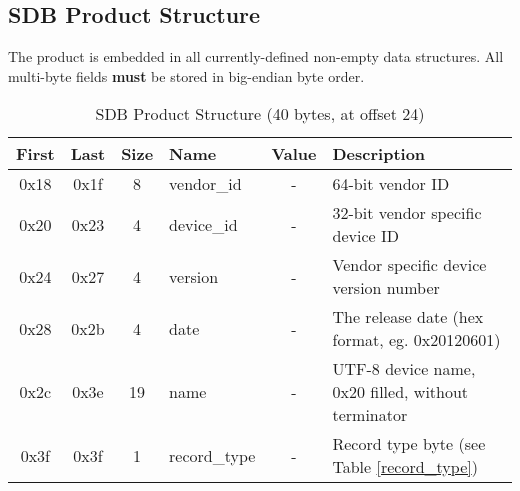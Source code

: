 \documentclass[a4paper, 12pt]{article}
\begin{document}
\subsection{SDB Product Structure}

The product is embedded in all currently-defined non-empty data structures.
All multi-byte fields \textbf{must} be stored in big-endian byte order.

\begin{center}
  \begin{savenotes}
    \begin{table}[!ht]\footnotesize
      \caption{SDB Product Structure (40 bytes, at offset 24)}\label{sdb_product}\centering
        \begin{tabular}{| c | c | c | l | c | p{5cm} |} \hline
        First & Last & Size & Name & Value & Description \\ \hline
        0x18 & 0x1f & 8 & vendor\_id & - & 64-bit vendor ID \\ \hline
        0x20 & 0x23 & 4 & device\_id & - & 32-bit vendor specific device ID \\ \hline
        0x24 & 0x27 & 4 & version & - & Vendor specific device version number \\ \hline
        0x28 & 0x2b & 4 & date & - & The release date (hex format, eg. 0x20120601) \\ \hline
        0x2c & 0x3e & 19 & name & - & UTF-8 device name, 0x20 filled, without terminator \\ \hline
        0x3f & 0x3f & 1 & record\_type & - & Record type byte (see Table \ref{record_type}) \\ \hline
        \end{tabular}
    \end{table}
  \end{savenotes}
\end{center}
\end{document}
